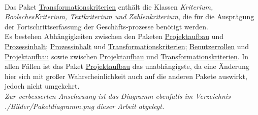 \vspace{1em}
\\Das Paket \underline{Transformationskriterien} enthält die Klassen \emph{Kriterium, BoolschesKriterium, Textkriterium und Zahlenkriterium}, die für die Ausprägung der Fortschrittserfassung der Geschäfts-prozesse benötigt werden.
\vspace{1em}
\\Es bestehen Abhängigkeiten zwischen den Paketen \underline{Projektaufbau} und \underline{Prozessinhalt}; \underline{Prozessinhalt} und \underline{Transformationskriterien}; \underline{Benutzerrollen} und \underline{Projektaufbau} sowie zwischen \underline{Projektaufbau} und \underline{Transformationskriterien}. In allen Fällen ist das Paket \underline{Projektaufbau} das unabhängigste, da eine Änderung hier sich mit großer Wahrscheinlichkeit auch auf die anderen Pakete auswirkt, jedoch nicht umgekehrt.
\vspace{1em}
\\\emph{Zur verbesserten Anschauung ist das Diagramm ebenfalls im Verzeichnis ./Bilder/Paketdiagramm.png dieser Arbeit abgelegt.}
